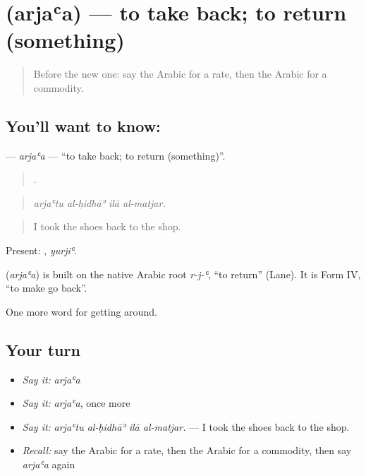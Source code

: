 \section[\texorpdfstring{\ar{أرجع} (arjaʿa)}{أرجع (arjaʿa)}]{ (arjaʿa) — to take back; to return (something)}

\label{lesson:AR-C458-arjaa}



\begin{quote}
Before the new one: say the Arabic for a rate, then the Arabic for a commodity.
\end{quote}

\subsection*{You'll want to know: }
\textbf{} — \emph{arjaʿa} — \textquotedblleft{}to take back; to return (something)\textquotedblright{}.

\begin{quote}
   .
\end{quote}

\begin{quote}
\emph{arjaʿtu al-ḥidhāʾ ilā al-matjar.}
\end{quote}

\begin{quote}
I took the shoes back to the shop.
\end{quote}

Present: , \emph{yurjiʿ}.

\begin{cousinweb}
\textbf{} (\emph{arjaʿa}) is built on the native Arabic root \emph{r-j-ʿ}, \textquotedblleft{}to return\textquotedblright{} (Lane). It is Form IV, \textquotedblleft{}to make go back\textquotedblright{}.
\end{cousinweb}

\begin{grammarlens}[title={What you've built}]
One more word for getting around.
\end{grammarlens}

\subsection*{Your turn}
\begin{itemize}
\raggedright
  \item \emph{Say it:} \emph{arjaʿa}
  \item \emph{Say it:} \emph{arjaʿa}, once more
  \item \emph{Say it:} \emph{arjaʿtu al-ḥidhāʾ ilā al-matjar.} — I took the shoes back to the shop.
  \item \emph{Recall:} say the Arabic for a rate, then the Arabic for a commodity, then say \emph{arjaʿa} again
\end{itemize}

